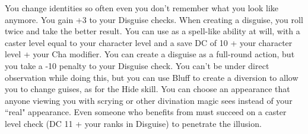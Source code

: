 {You change identities so often even you don't remember what you look like anymore.}
{You gain +3 to your Disguise checks.}
{When creating a disguise, you roll twice and take the better result.}
{You can use  as a spell-like ability at will, with a caster level equal to your character level and a save DC of 10 + \half your character level + your Cha modifier.}
{You can create a disguise as a full-round action, but you take a -10 penalty to your Disguise check. You can't be under direct observation while doing this, but you can use Bluff to create a diversion to allow you to change guises, as for the Hide skill.}
{You can choose an appearance that anyone viewing you with scrying or other divination magic sees instead of your ``real" appearance. Even someone who benefits from  must succeed on a caster level check (DC 11 + your ranks in Disguise) to penetrate the illusion.}